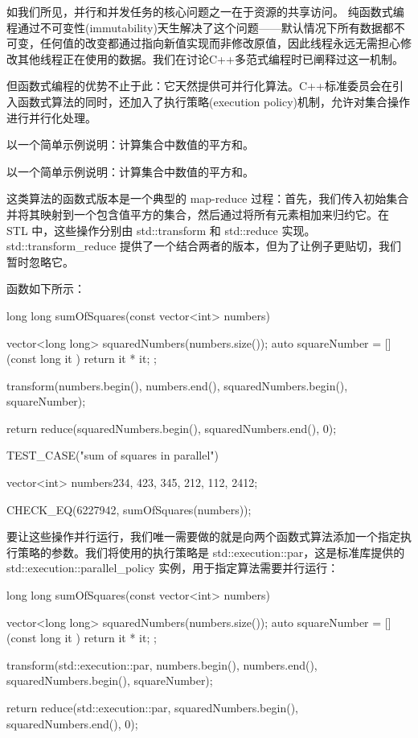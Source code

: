 
如我们所见，并行和并发任务的核心问题之一在于资源的共享访问。
纯函数式编程通过不可变性(immutability)天生解决了这个问题——默认情况下所有数据都不可变，任何值的改变都通过指向新值实现而非修改原值，因此线程永远无需担心修改其他线程正在使用的数据。我们在讨论C++多范式编程时已阐释过这一机制。

但函数式编程的优势不止于此：它天然提供可并行化算法。C++标准委员会在引入函数式算法的同时，还加入了执行策略(execution policy)机制，允许对集合操作进行并行化处理。

以一个简单示例说明：计算集合中数值的平方和。

以一个简单示例说明：计算集合中数值的平方和。

这类算法的函数式版本是一个典型的 map-reduce 过程：首先，我们传入初始集合并将其映射到一个包含值平方的集合，然后通过将所有元素相加来归约它。在 STL 中，这些操作分别由 std::transform 和 std::reduce 实现。std::transform\_reduce 提供了一个结合两者的版本，但为了让例子更贴切，我们暂时忽略它。

函数如下所示：

\begin{cpp}
long long sumOfSquares(const vector<int> numbers){
  vector<long long> squaredNumbers(numbers.size());
  auto squareNumber = [](const long it ){ return it * it; };

  transform(numbers.begin(), numbers.end(), squaredNumbers.begin(), squareNumber);

  return reduce(squaredNumbers.begin(), squaredNumbers.end(), 0);
}

TEST_CASE("sum of squares in parallel") {
  vector<int> numbers{234, 423, 345, 212, 112, 2412};

  CHECK_EQ(6227942, sumOfSquares(numbers));
}
\end{cpp}

要让这些操作并行运行，我们唯一需要做的就是向两个函数式算法添加一个指定执行策略的参数。我们将使用的执行策略是 std::execution::par，这是标准库提供的 std::execution::parallel\_policy 实例，用于指定算法需要并行运行：

\begin{cpp}
long long sumOfSquares(const vector<int> numbers){
  vector<long long> squaredNumbers(numbers.size());
  auto squareNumber = [](const long it ){ return it * it; };

  transform(std::execution::par, numbers.begin(), numbers.end(), squaredNumbers.begin(), squareNumber);

  return reduce(std::execution::par, squaredNumbers.begin(), squaredNumbers.end(), 0);
}
\end{cpp}

